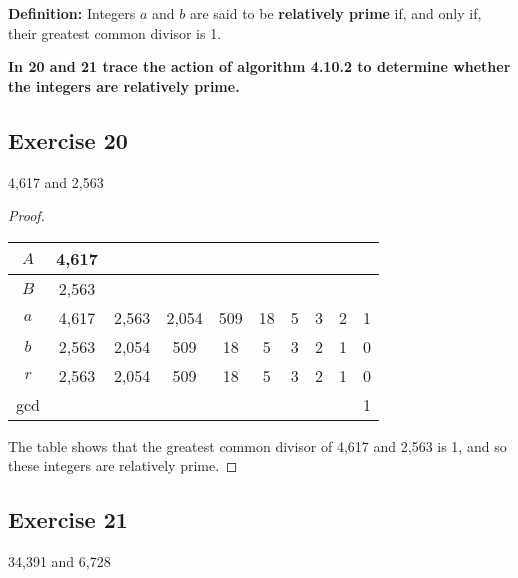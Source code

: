 \documentclass[14pt]{extarticle}
\newcommand{\cy}{\color{cyan}}
\begin{document}
\begin{tcolorbox}[colframe=cyan]
    {\bf \cy Definition:} Integers $a$ and $b$ are said to be {\bf relatively prime} if, and only if, their greatest common divisor is 1.
\end{tcolorbox}

{\bf \cy In 20 and 21 trace the action of algorithm 4.10.2 to determine whether the integers are relatively prime.}

\subsection{Exercise 20}
4,617 and 2,563

\begin{proof}
    \begin{center}
        \begin{tabular}{|c|c|c|c|c|c|c|c|c|c|}
            \hline
            $A$ & 4,617 &       &       &     &    &   &   &   &   \\
            \hline
            $B$ & 2,563 &       &       &     &    &   &   &   &   \\
            \hline
            $a$ & 4,617 & 2,563 & 2,054 & 509 & 18 & 5 & 3 & 2 & 1 \\
            \hline
            $b$ & 2,563 & 2,054 & 509   & 18  & 5  & 3 & 2 & 1 & 0 \\
            \hline
            $r$ & 2,563 & 2,054 & 509   & 18  & 5  & 3 & 2 & 1 & 0 \\
            \hline
            gcd &       &       &       &     &    &   &   &   & 1 \\
            \hline
        \end{tabular}
    \end{center}

    The table shows that the greatest common divisor of 4,617 and 2,563 is 1, and so these integers are relatively prime.
\end{proof}

\subsection{Exercise 21}
34,391 and 6,728
\end{document}
